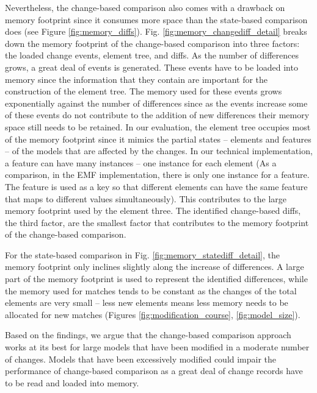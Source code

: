 \documentclass{jot}
\begin{document}
Nevertheless, the change-based comparison also comes with a drawback on memory footprint since it consumes more space than the state-based comparison does (see Figure \ref{fig:memory_diffs}). Fig. \ref{fig:memory_changediff_detail} breaks down the memory footprint of the change-based comparison into three factors: the loaded change events, element tree, and diffs. As the number of differences grows, a great deal of events is generated. These events have to be loaded into memory since the information that they contain are important for the construction of the element tree. The memory used for these events grows exponentially against the number of differences since as the events increase some of these events do not contribute to the addition of new differences their memory space still needs to be retained. In our evaluation, the element tree occupies most of the memory footprint since it mimics the partial states -- elements and features -- of the models that are affected by the changes. In our technical implementation, a feature can have many instances -- one instance for each element (As a comparison, in the EMF implementation, there is only one instance for a feature. The feature is used as a key so that different elements can have the same feature that maps to different values simultaneously). This contributes to the large memory footprint used by the element three. The identified change-based diffs, the third factor, are the smallest factor that contributes to the memory footprint of the change-based comparison. 

For the state-based comparison in Fig. \ref{fig:memory_statediff_detail}, the memory footprint only inclines slightly along the increase of differences. A large part of the memory footprint is used to represent the identified differences, while the memory used for matches tends to be constant as the changes of the total elements are very small -- less new elements means less memory needs to be allocated for new matches (Figures \ref{fig:modification_course}, \ref{fig:model_size}). 

Based on the findings, we argue that the change-based comparison approach works at its best for large models that have been modified in a moderate number of changes. Models that have been excessively modified could impair the performance of change-based comparison as a great deal of change records have to be read and loaded into memory. 
\end{document}
